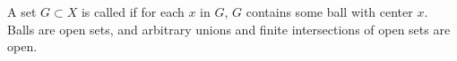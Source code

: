A set $G \subset X$ is called  if for each $x$ in $G$, $G$ contains some ball with center $x$. Balls are open sets, and arbitrary unions and finite intersections of open sets are open.
